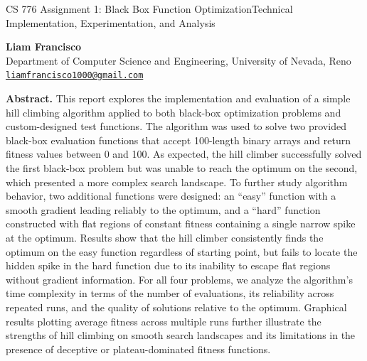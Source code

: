 \documentclass[11pt]{article}
\begin{document}
\linespread{1.2}\selectfont

\begin{center}

\begin{LARGE}
CS 776 Assignment 1: Black Box Function Optimization\vspace*{0.3cm}\linebreak Technical Implementation, Experimentation, and Analysis
\end{LARGE}

\vspace*{1cm}

\textbf{Liam Francisco} \\
Department of Computer Science and Engineering, University of Nevada, Reno \\
\href{mailto:liamfrancisco1000@gmail.com}{\tt liamfrancisco1000@gmail.com}

\vspace*{0.5cm}


\vspace*{0.8cm}


\end{center}
%
\noindent
\textbf{Abstract.}
This report explores the implementation and evaluation of a simple hill climbing algorithm applied to both black-box optimization problems and custom-designed test functions. The algorithm was used to solve two provided black-box evaluation functions that accept 100-length binary arrays and return fitness values between 0 and 100. As expected, the hill climber successfully solved the first black-box problem but was unable to reach the optimum on the second, which presented a more complex search landscape. To further study algorithm behavior, two additional functions were designed: an “easy” function with a smooth gradient leading reliably to the optimum, and a “hard” function constructed with flat regions of constant fitness containing a single narrow spike at the optimum. Results show that the hill climber consistently finds the optimum on the easy function regardless of starting point, but fails to locate the hidden spike in the hard function due to its inability to escape flat regions without gradient information. For all four problems, we analyze the algorithm’s time complexity in terms of the number of evaluations, its reliability across repeated runs, and the quality of solutions relative to the optimum. Graphical results plotting average fitness across multiple runs further illustrate the strengths of hill climbing on smooth search landscapes and its limitations in the presence of deceptive or plateau-dominated fitness functions.
\vspace*{0.3cm}
\end{document}

